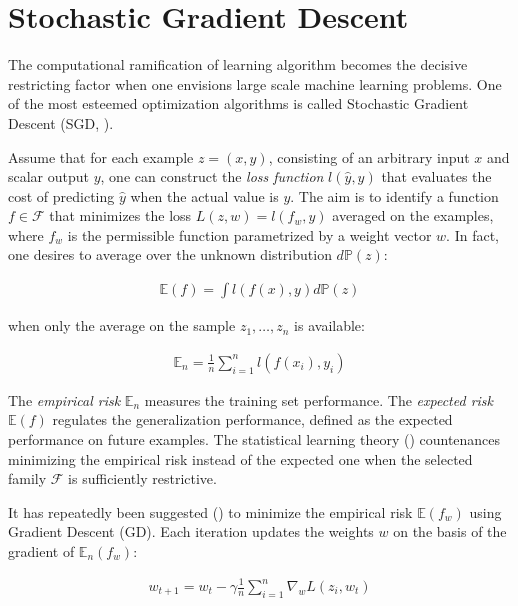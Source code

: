 \documentclass{pracamgr}
\numberwithin{equation}{section}
\begin{document}
\section{Stochastic Gradient Descent}

The computational ramification of learning algorithm becomes the decisive restricting factor when one envisions large scale machine learning problems. One of the most esteemed optimization algorithms is called Stochastic Gradient Descent (SGD, \citet{robbins1951stochastic}).

Assume that for each example $z = (x, y)$, consisting of an arbitrary input $x$ and scalar output $y$, one can construct the \textit{loss function} $l(\hat{y}, y)$ that evaluates the cost of predicting $\hat{y}$ when the actual value is $y$. The aim is to identify a function $f \in \mathcal{F}$ that minimizes the loss $L(z, w) = l(f_{w}, y)$ averaged on the examples, where $f_{w}$ is the permissible function parametrized by a weight vector $w$. In fact, one desires to average over the unknown distribution $d \mathbb{P}(z)$:

\begin{align}
\mathbb{E} (f) = \int l(f(x), y) d \mathbb{P}(z)
\end{align}

when only the average on the sample $z_{1}, \ldots, z_{n}$ is available:

\begin{align}
\mathbb{E}_{n} = \frac{1}{n} \sum\limits_{i=1}^{n} l(f(x_{i}), y_{i})
\end{align}

The \textit{empirical risk} $\mathbb{E}_{n}$ measures the training set performance. The \textit{expected risk} $\mathbb{E} (f)$ regulates the generalization performance, defined as the expected performance on future examples. The statistical learning theory (\citet{vapnik2015uniform}) countenances minimizing the empirical risk instead of the expected one when the selected family $\mathcal{F}$ is sufficiently restrictive.

It has repeatedly been suggested (\citet{rumelhart1985learning}) to minimize the empirical risk $\mathbb{E} (f_{w})$ using Gradient Descent (GD). Each iteration updates the weights $w$ on the basis of the gradient of $\mathbb{E}_{n} (f_{w})$:

\begin{align}
w_{t+1} = w_{t} - \gamma \frac{1}{n} \sum\limits_{i=1}^{n} \nabla_{w} L(z_{i}, w_{t})
\end{align}
\end{document}
